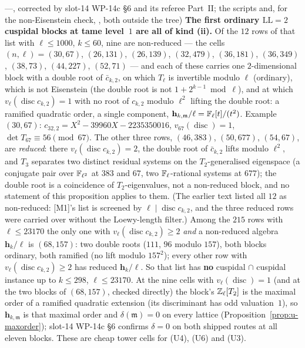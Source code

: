 \documentclass[11pt]{article}
\newcommand{\hcusp}{\mathbf{h}}                   %
\newcommand{\Zl}{\Z_\ell}
\newcommand{\LL}{\mathrm{LL}}                     %
\begin{document}
\begin{proposition}
\begin{enumerate}
  ---, corrected by slot-14 WP-14c \S6 and its referee  Part~II; the scripts
   and, for the non-Eisenstein check,
  , both outside the tree)
  \textbf{The first ordinary $\LL=2$ cuspidal blocks at tame level~$1$ are all of kind (ii).} Of the $12$ rows of that list with
  $\ell\le1000$, $k\le60$, nine are non-reduced --- the cells $(n,\ell)=(30,67)$, $(26,131)$, $(26,139)$, $(32,479)$, $(36,181)$,
  $(36,349)$, $(38,73)$, $(44,227)$, $(52,71)$ --- and each of these carries one $2$-dimensional block with a double root of
  $\bar c_{k,2}$, on which $T_\ell$ is invertible modulo $\ell$ (ordinary), which is not Eisenstein (the double root is not
  $1+2^{k-1}\bmod\ell$), and at which $v_\ell(\operatorname{disc}c_{k,2})=1$ with no root of $c_{k,2}$ modulo $\ell^{2}$ lifting the
  double root: a ramified quadratic order, a single component, $\hcusp_{k,\mathfrak m}/\ell=\Fl[t]/(t^{2})$. Example $(30,67)$:
  $c_{32,2}=X^{2}-39960X-2235350016$, $v_{67}(\operatorname{disc})=1$, $\det T_{67}\equiv56\pmod{67}$. The other three rows,
  $(46,383)$, $(50,677)$, $(54,67)$, are \emph{reduced}: there $v_\ell(\operatorname{disc}c_{k,2})=2$, the double root of
  $\bar c_{k,2}$ lifts modulo $\ell^{2}$, and $T_3$ separates two distinct residual systems on the $T_2$-generalised eigenspace
  (a conjugate pair over $\mathbb{F}_{\ell^{2}}$ at $383$ and $67$, two $\mathbb{F}_\ell$-rational systems at $677$); the double root is a coincidence
  of $T_2$-eigenvalues, not a non-reduced block, and no statement of this proposition applies to them. (The earlier text listed
  all $12$ as non-reduced: [M1]'s list is screened by $\ell\mid\operatorname{disc}c_{k,2}$, and the three reduced rows were
  carried over without the Loewy-length filter.) Among the $215$ rows with $\ell\le23170$ the only one with
  $v_\ell(\operatorname{disc}c_{k,2})\ge2$ \emph{and} a non-reduced algebra $\hcusp_k/\ell$ is $(68,157)$: two double roots
  ($111$, $96$ modulo $157$), both blocks ordinary, both ramified (no lift modulo $157^{2}$); every other row with
  $v_\ell(\operatorname{disc}c_{k,2})\ge2$ has reduced $\hcusp_k/\ell$. So that list has \textbf{no} cuspidal $\cap$ cuspidal
  instance up to $k\le298$, $\ell\le23170$. At the nine cells with $v_\ell(\operatorname{disc})=1$ (and at the two blocks of
  $(68,157)$, checked directly) the block's $\Zl[T_2]$ is the maximal order of a ramified quadratic extension (its discriminant
  has odd valuation~$1$), so $\hcusp_{k,\mathfrak m}$ is that maximal order and $\delta(\mathfrak m)=0$ on every lattice
  (Proposition~\ref{prop:u-maxorder}); slot-14 WP-14c \S6 confirms $\delta=0$ on both shipped routes at all eleven blocks. These
  are cheap tower cells for (U4), (U6) and (U3).
\end{enumerate}
\end{proposition}
\end{document}

